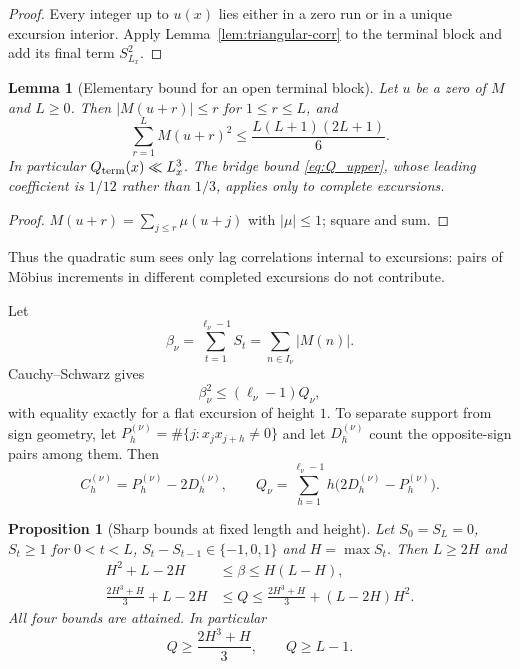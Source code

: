 \documentclass[11pt]{amsart}
\numberwithin{equation}{section}
\theoremstyle{plain}
\newtheorem{proposition}[theorem]{Proposition}
\newtheorem{lemma}[theorem]{Lemma}
\theoremstyle{definition}
\theoremstyle{remark}
\begin{document}
\begin{proof}
Every integer up to $u(x)$ lies either in a zero run or in a unique excursion
interior. Apply Lemma~\ref{lem:triangular-corr} to the terminal block and
add its final term $S_{L_x}^2$.
\end{proof}

\begin{lemma}[Elementary bound for an open terminal block]
\label{lem:terminal-Q-elementary}
Let $u$ be a zero of $M$ and $L\ge0$. Then $|M(u+r)|\le r$ for
$1\le r\le L$, and
\begin{equation}
\label{eq:terminal-Q-elementary}
\sum_{r=1}^{L}M(u+r)^2\le\frac{L(L+1)(2L+1)}6 .
\end{equation}
In particular $Q_{\rm term}(x)\ll L_x^3$. The bridge bound
\eqref{eq:Q_upper}, whose leading coefficient is $1/12$ rather than $1/3$,
applies only to complete excursions.
\end{lemma}

\begin{proof}
$M(u+r)=\sum_{j\le r}\mu(u+j)$ with $|\mu|\le1$; square and sum.
\end{proof}


Thus the quadratic sum sees only lag correlations internal to excursions:
pairs of M\"obius increments in different completed excursions do not
contribute.

Let
\begin{equation}
\label{eq:beta_def}
\beta_\nu=\sum_{t=1}^{\ell_\nu-1}S_t=\sum_{n\in I_\nu}|M(n)|.
\end{equation}
Cauchy--Schwarz gives
\begin{equation}
\label{eq:beta-Q}
\beta_\nu^2\le(\ell_\nu-1)Q_\nu,
\end{equation}
with equality exactly for a flat excursion of height $1$. To separate
support from sign geometry, let $P_h^{(\nu)}=\#\{j:x_jx_{j+h}\ne0\}$ and let
$D_h^{(\nu)}$ count the opposite-sign pairs among them. Then
\begin{equation}
\label{eq:C-P-D}
C_h^{(\nu)}=P_h^{(\nu)}-2D_h^{(\nu)},\qquad
Q_\nu=\sum_{h=1}^{\ell_\nu-1}h\bigl(2D_h^{(\nu)}-P_h^{(\nu)}\bigr).
\end{equation}

\begin{proposition}[Sharp bounds at fixed length and height]
\label{prop:sharp-LH}
Let $S_0=S_L=0$, $S_t\ge1$ for $0<t<L$, $S_t-S_{t-1}\in\{-1,0,1\}$ and
$H=\max S_t$. Then $L\ge2H$ and
\begin{align}
H^2+L-2H&\le\beta\le H(L-H),\label{eq:beta-LH}\\
\frac{2H^3+H}{3}+L-2H&\le Q\le
\frac{2H^3+H}{3}+(L-2H)H^2.\label{eq:Q-LH}
\end{align}
All four bounds are attained. In particular
\begin{equation}
\label{eq:height_Q_min}
Q\ge\frac{2H^3+H}{3},\qquad Q\ge L-1.
\end{equation}
\end{proposition}
\end{document}
